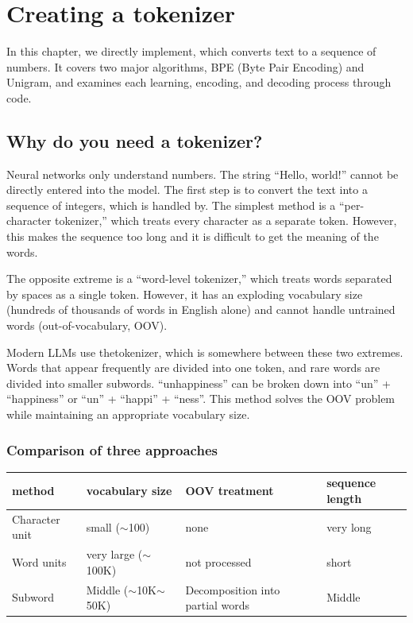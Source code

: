 \chapter{Creating a tokenizer}
\label{ch:tokenizer}

In this chapter, we directly implement, which converts text to a sequence of numbers. It covers two major algorithms, BPE (Byte Pair Encoding) and Unigram, and examines each learning, encoding, and decoding process through code.

\section{Why do you need a tokenizer?}

Neural networks only understand numbers. The string ``Hello, world!'' cannot be directly entered into the model. The first step is to convert the text into a sequence of integers, which is handled by. The simplest method is a ``per-character tokenizer,'' which treats every character as a separate token. However, this makes the sequence too long and it is difficult to get the meaning of the words.

The opposite extreme is a ``word-level tokenizer,'' which treats words separated by spaces as a single token. However, it has an exploding vocabulary size (hundreds of thousands of words in English alone) and cannot handle untrained words (out-of-vocabulary, OOV).

Modern LLMs use thetokenizer, which is somewhere between these two extremes. Words that appear frequently are divided into one token, and rare words are divided into smaller subwords. ``unhappiness'' can be broken down into ``un'' + ``happiness'' or ``un'' + ``happi'' + ``ness''. This method solves the OOV problem while maintaining an appropriate vocabulary size.

\subsection{Comparison of three approaches}

\begin{center}
\begin{tabularx}{\textwidth}{lXXX}
\toprule
\textbf{method}&\textbf{vocabulary size}&\textbf{OOV treatment}&\textbf{sequence length}\\
\midrule
Character unit & small ($\sim$100) & none & very long \\
Word units & very large ($\sim$100K) & not processed & short \\
Subword & Middle ($\sim$10K$\sim$50K) & Decomposition into partial words & Middle \\
\bottomrule
\end{tabularx}
\end{center}

